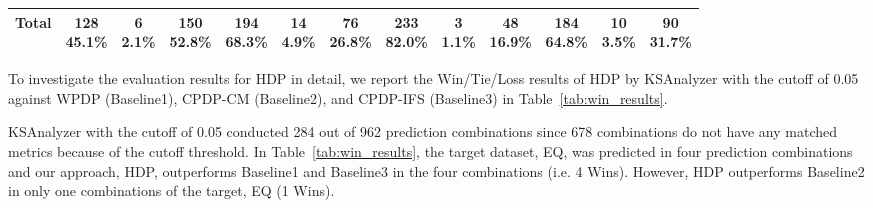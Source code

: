 \begin{table}[!t]
\begin{tabular}{|c||c|c|c||c|c|c||c|c|c||c|c|c|}
    Total       &\specialcell{{128}\\{45.1\%}}  &\specialcell{{6}\\{2.1\%}}     &\specialcell{{150}\\{52.8\%}}  &\specialcell{{194}\\{68.3\%}}  &\specialcell{{14}\\{4.9\%}}    &\specialcell{{76}\\{26.8\%}}   &\specialcell{{233}\\{82.0\%}}  &\specialcell{{3}\\{1.1\%}}     &\specialcell{{48}\\{16.9\%}}   &\specialcell{{184}\\{64.8\%}}  &\specialcell{{10}\\{3.5\%}}    &\specialcell{{90}\\{31.7\%}}\\ \hline
\end{tabular}
\end{table}


To investigate the evaluation results for HDP in detail, we report
the Win/Tie/Loss results of HDP by KSAnalyzer with the cutoff of 0.05 against
WPDP (Baseline1), CPDP-CM (Baseline2), and CPDP-IFS
(Baseline3) in Table~\ref{tab:win_results}.


KSAnalyzer with the cutoff of 0.05 conducted 284 out of 962 prediction
combinations since 678 combinations do not have any matched
metrics because of the cutoff threshold. In
Table~\ref{tab:win_results}, the target dataset, EQ, was predicted in four
prediction combinations and our approach, HDP, outperforms Baseline1 and
Baseline3 in the four combinations (i.e. 4 Wins). However, HDP outperforms
Baseline2 in only one combinations of the target, EQ (1 Wins).



